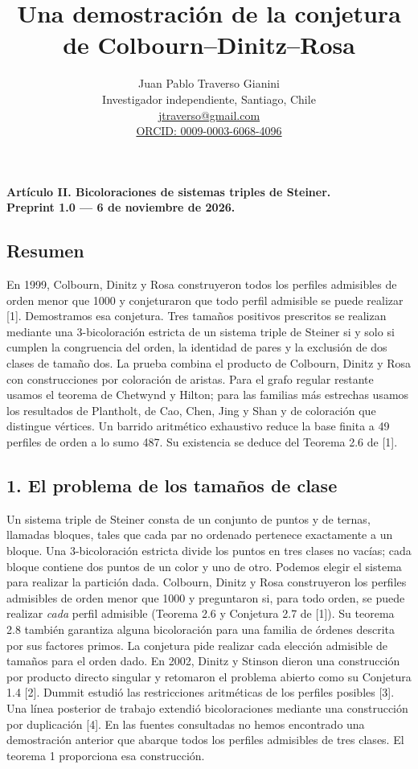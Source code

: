 \documentclass[spanish,11pt,a4paper]{article}
\title{Una demostración de la conjetura de Colbourn–Dinitz–Rosa}
\author{Juan Pablo Traverso Gianini\\\small Investigador independiente, Santiago, Chile\\\small \href{mailto:jtraverso@gmail.com}{jtraverso@gmail.com}\\\small \href{https://orcid.org/0009-0003-6068-4096}{ORCID: 0009-0003-6068-4096}}
\date{}
\begin{document}
\raggedbottom
\maketitle
\textbf{Artículo II. Bicoloraciones de sistemas triples de Steiner.}\\\textbf{Preprint 1.0 — 6 de noviembre de 2026.}

\subsection{Resumen}\label{resumen}

En 1999, Colbourn, Dinitz y Rosa construyeron todos los perfiles admisibles de orden menor que 1000 y conjeturaron que todo perfil admisible se puede realizar {[}1{]}. Demostramos esa conjetura. Tres tamaños positivos prescritos se realizan mediante una 3-bicoloración estricta de un sistema triple de Steiner si y solo si cumplen la congruencia del orden, la identidad de pares y la exclusión de dos clases de tamaño dos. La prueba combina el producto de Colbourn, Dinitz y Rosa con construcciones por coloración de aristas. Para el grafo regular restante usamos el teorema de Chetwynd y Hilton; para las familias más estrechas usamos los resultados de Plantholt, de Cao, Chen, Jing y Shan y de coloración que distingue vértices. Un barrido aritmético exhaustivo reduce la base finita a 49 perfiles de orden a lo sumo 487. Su existencia se deduce del Teorema 2.6 de {[}1{]}.

\subsection{1. El problema de los tamaños de clase}\label{el-problema-de-los-tamauxf1os-de-clase}

Un sistema triple de Steiner consta de un conjunto de puntos y de ternas, llamadas bloques, tales que cada par no ordenado pertenece exactamente a un bloque. Una 3-bicoloración estricta divide los puntos en tres clases no vacías; cada bloque contiene dos puntos de un color y uno de otro. Podemos elegir el sistema para realizar la partición dada. Colbourn, Dinitz y Rosa construyeron los perfiles admisibles de orden menor que 1000 y preguntaron si, para todo orden, se puede realizar \emph{cada} perfil admisible (Teorema 2.6 y Conjetura 2.7 de {[}1{]}). Su teorema 2.8 también garantiza alguna bicoloración para una familia de órdenes descrita por sus factores primos. La conjetura pide realizar cada elección admisible de tamaños para el orden dado. En 2002, Dinitz y Stinson dieron una construcción por producto directo singular y retomaron el problema abierto como su Conjetura 1.4 {[}2{]}. Dummit estudió las restricciones aritméticas de los perfiles posibles {[}3{]}. Una línea posterior de trabajo extendió bicoloraciones mediante una construcción por duplicación {[}4{]}. En las fuentes consultadas no hemos encontrado una demostración anterior que abarque todos los perfiles admisibles de tres clases. El teorema 1 proporciona esa construcción.
\end{document}
